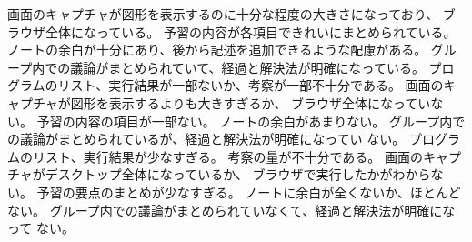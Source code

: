 \documentclass[a4j]{jreport}
\begin{document}
{{  {画面のキャプチャが図形を表示するのに十分な程度の大きさになっており、
  ブラウザ全体になっている。}
  {予習の内容が各項目できれいにまとめられている。}
  {ノートの余白が十分にあり、後から記述を追加できるような配慮がある。}
  {グループ内での議論がまとめられていて、経過と解決法が明確になっている。}
  }
  {
  {プログラムのリスト、実行結果が一部ないか、考察が一部不十分である。}
  {画面のキャプチャが図形を表示するよりも大きすぎるか、
  ブラウザ全体になっていない。}
  {予習の内容の項目が一部ない。}
  {ノートの余白があまりない。}
  {グループ内での議論がまとめられているが、経過と解決法が明確になってい
  ない。}
  }
  {
  {プログラムのリスト、実行結果が少なすぎる。}
  {考察の量が不十分である。}
  {画面のキャプチャがデスクトップ全体になっているか、
  ブラウザで実行したかがわからない。}
  {予習の要点のまとめが少なすぎる。}
  {ノートに余白が全くないか、ほとんどない。}
  {グループ内での議論がまとめられていなくて、経過と解決法が明確になって
  ない。}
  }
}
\end{document}
